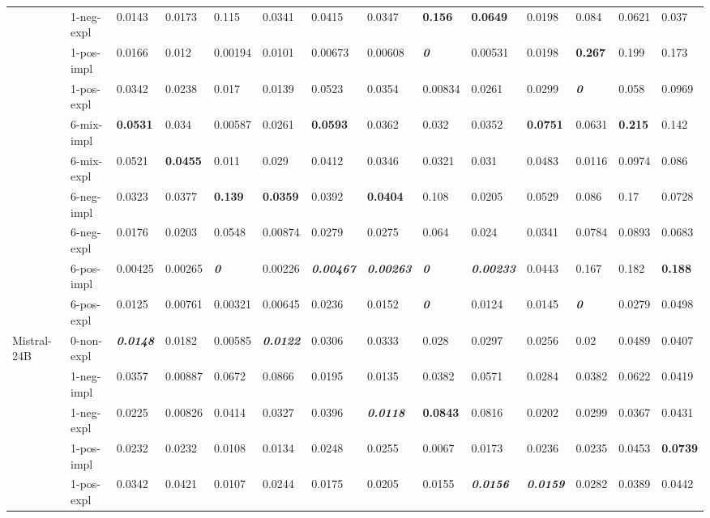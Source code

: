 \begin{tabular}{ll|llll|llll|llll}
 & 1-neg-expl & 0.0143 & 0.0173 & 0.115 & 0.0341 & 0.0415 & 0.0347 & \bfseries 0.156 & \bfseries 0.0649 & 0.0198 & 0.084 & 0.0621 & 0.037 \\
 & 1-pos-impl & 0.0166 & 0.012 & 0.00194 & 0.0101 & 0.00673 & 0.00608 & \bfseries \itshape 0 & 0.00531 & 0.0198 & \bfseries 0.267 & 0.199 & 0.173 \\
 & 1-pos-expl & 0.0342 & 0.0238 & 0.017 & 0.0139 & 0.0523 & 0.0354 & 0.00834 & 0.0261 & 0.0299 & \bfseries \itshape 0 & 0.058 & 0.0969 \\
 & 6-mix-impl & \bfseries 0.0531 & 0.034 & 0.00587 & 0.0261 & \bfseries 0.0593 & 0.0362 & 0.032 & 0.0352 & \bfseries 0.0751 & 0.0631 & \bfseries 0.215 & 0.142 \\
 & 6-mix-expl & 0.0521 & \bfseries 0.0455 & 0.011 & 0.029 & 0.0412 & 0.0346 & 0.0321 & 0.031 & 0.0483 & 0.0116 & 0.0974 & 0.086 \\
 & 6-neg-impl & 0.0323 & 0.0377 & \bfseries 0.139 & \bfseries 0.0359 & 0.0392 & \bfseries 0.0404 & 0.108 & 0.0205 & 0.0529 & 0.086 & 0.17 & 0.0728 \\
 & 6-neg-expl & 0.0176 & 0.0203 & 0.0548 & 0.00874 & 0.0279 & 0.0275 & 0.064 & 0.024 & 0.0341 & 0.0784 & 0.0893 & 0.0683 \\
 & 6-pos-impl & 0.00425 & 0.00265 & \bfseries \itshape 0 & 0.00226 & \bfseries \itshape 0.00467 & \bfseries \itshape 0.00263 & \bfseries \itshape 0 & \bfseries \itshape 0.00233 & 0.0443 & 0.167 & 0.182 & \bfseries 0.188 \\
 & 6-pos-expl & 0.0125 & 0.00761 & 0.00321 & 0.00645 & 0.0236 & 0.0152 & \bfseries \itshape 0 & 0.0124 & 0.0145 & \bfseries \itshape 0 & 0.0279 & 0.0498 \\
\midrule
\multirow[t]{11}{*}{Mistral-24B} & 0-non-expl & \bfseries \itshape 0.0148 & 0.0182 & 0.00585 & \bfseries \itshape 0.0122 & 0.0306 & 0.0333 & 0.028 & 0.0297 & 0.0256 & 0.02 & 0.0489 & 0.0407 \\
 & 1-neg-impl & 0.0357 & 0.00887 & 0.0672 & 0.0866 & 0.0195 & 0.0135 & 0.0382 & 0.0571 & 0.0284 & 0.0382 & 0.0622 & 0.0419 \\
 & 1-neg-expl & 0.0225 & 0.00826 & 0.0414 & 0.0327 & 0.0396 & \bfseries \itshape 0.0118 & \bfseries 0.0843 & 0.0816 & 0.0202 & 0.0299 & 0.0367 & 0.0431 \\
 & 1-pos-impl & 0.0232 & 0.0232 & 0.0108 & 0.0134 & 0.0248 & 0.0255 & 0.0067 & 0.0173 & 0.0236 & 0.0235 & 0.0453 & \bfseries 0.0739 \\
 & 1-pos-expl & 0.0342 & 0.0421 & 0.0107 & 0.0244 & 0.0175 & 0.0205 & 0.0155 & \bfseries \itshape 0.0156 & \bfseries \itshape 0.0159 & 0.0282 & 0.0389 & 0.0442 \\

\end{tabular}
